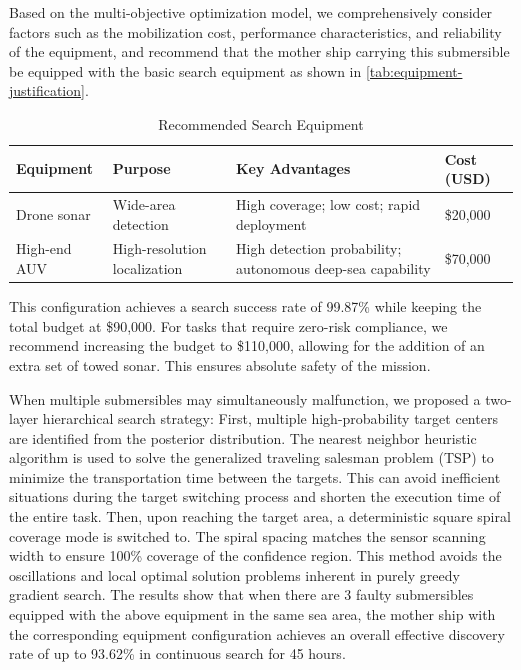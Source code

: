 \documentclass{mcmthesis}
\begin{document}
Based on the multi-objective optimization model, we comprehensively consider factors such as the mobilization cost, performance characteristics, and reliability of the equipment,
and recommend that the mother ship carrying this submersible be equipped with the basic search equipment as shown in \autoref{tab:equipment-justification}. 
\begin{table}[htbp]
\centering
\small
\setlength{\tabcolsep}{6pt}
\renewcommand{\arraystretch}{1.15}
\caption{Recommended Search Equipment}
\label{tab:equipment-justification}
\begin{tabularx}{\linewidth}{@{}l X X >{\raggedleft\arraybackslash}p{2.2cm}@{}}
\toprule
\textbf{Equipment} & \textbf{Purpose} & \textbf{Key Advantages} & \textbf{Cost (USD)} \\
\midrule
Drone sonar & Wide-area detection & High coverage; low cost; rapid deployment & \$20{,}000 \\
High-end AUV & High-resolution localization & High detection probability; autonomous deep-sea capability & \$70{,}000 \\
\bottomrule
\end{tabularx}
\end{table}
This configuration achieves a search success rate of 99.87\% while keeping the total budget at \$90,000.
For tasks that require zero-risk compliance, we recommend increasing the budget to \$110,000, allowing for the addition of an extra set of towed sonar. This ensures absolute safety of the mission.

When multiple submersibles may simultaneously malfunction, we proposed a two-layer hierarchical search strategy:
First, multiple high-probability target centers are identified from the posterior distribution.
The nearest neighbor heuristic algorithm is used to solve the generalized traveling salesman problem (TSP) to minimize the transportation time between the targets.
This can avoid inefficient situations during the target switching process and shorten the execution time of the entire task.
Then, upon reaching the target area, a deterministic square spiral coverage mode is switched to.
The spiral spacing matches the sensor scanning width to ensure 100\% coverage of the confidence region.
This method avoids the oscillations and local optimal solution problems inherent in purely greedy gradient search.
The results show that when there are 3 faulty submersibles equipped with the above equipment in the same sea area, the mother ship with the corresponding equipment configuration achieves an overall effective discovery rate of up to 93.62\% in continuous search for 45 hours.
\end{document}
